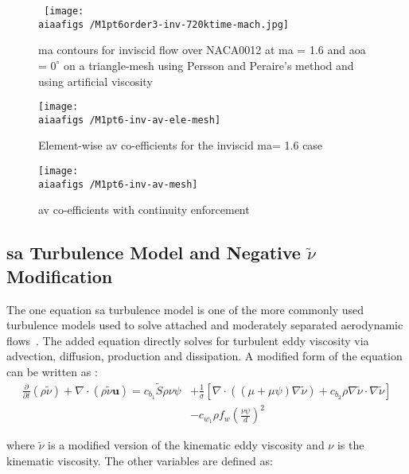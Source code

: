 \begin{figure}[h] \tt
\centering
\texttt{[image: \\aiaafigs /M1pt6order3-inv-720ktime-mach.jpg]} \\
\caption{\gls{ma} contours for inviscid flow over NACA0012 at \gls{ma} = 1.6 and \gls{aoa} = $0^{\circ} $ on a triangle-mesh using Persson and Peraire's method and using artificial viscosity}
\label{fig:inv_mach}
\end{figure}

\begin{figure}
\centering
\begin{minipage}[t]{.55\textwidth}
  \centering
  \texttt{[image: \\aiaafigs /M1pt6-inv-av-ele-mesh]}
  \caption{Element-wise \gls{av} co-efficients for the inviscid \gls{ma}= 1.6 case}
  \label{fig:AV-ele}
\end{minipage}%
\begin{minipage}[t]{.55\textwidth}
  \centering
  \texttt{[image: \\aiaafigs /M1pt6-inv-av-mesh]}
  \caption{\gls{av} co-efficients with continuity enforcement}
  \label{fig:AV-cont}
\end{minipage}
\end{figure} 

\subsection{\gls{sa} Turbulence Model and Negative $\tilde\nu$ Modification}

The one equation \gls{sa} turbulence model is one of the more commonly used turbulence models used to solve attached and moderately separated aerodynamic flows~\cite{spalart1992one}. The added equation directly solves for turbulent eddy viscosity via advection, diffusion, production and dissipation. A modified form of the equation can be written as \cite{burgess2012robust,oliver2008high,moro2011navier}:
\begin{equation}
\begin{split}
	\frac{\partial}{\partial t}(\rho\tilde\nu) + \nabla\cdot(\rho\tilde\nu\boldsymbol{u}) = c_{b_1}\tilde S \rho\nu\psi &+ \frac{1}{\sigma}\left[\nabla\cdot((\mu + \mu\psi)\nabla\tilde\nu) + c_{b_2}\rho\nabla\tilde\nu\cdot\nabla\tilde\nu\right] \\&- c_{w_1}\rho f_w \left(\frac{\nu\psi}{d}\right)^2
\end{split}
\end{equation}

where $\tilde\nu$ is a modified version of the kinematic eddy viscosity and $\nu$ is the kinematic viscosity. The other variables are defined as:

